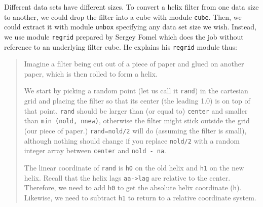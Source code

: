 \par
Different data sets have different sizes.
To convert a helix filter from one data size to another,
we could drop the filter into a cube with module \texttt{cube}.
Then, we could extract it with module \texttt{unbox}
specifying any data set size we wish.
Instead, we use module
\texttt{regrid} %
prepared by Sergey Fomel
which does the job without reference to an underlying filter cube.
He explains his \texttt{regrid} module thus:
        \begin{quotation}
        Imagine a filter being cut out of a piece of paper and
        glued on another paper, which is then rolled to form a helix.
\par            %
        We start by picking a random point (let us call it
        \texttt{rand}) in the
        cartesian grid and placing the filter so that its center
        (the leading 1.0) is on top of that point.
        \texttt{rand} should be larger than (or equal to)
        \texttt{center} and
        smaller than \texttt{min (nold, nnew)},
        otherwise the filter might stick outside the grid
        (our piece of paper.)
        \texttt{rand=nold/2} will do (assuming the filter is small),
        although nothing should change
        if you replace \texttt{nold/2} with a random integer array
        between \texttt{center} and \texttt{nold - na}.
\par
        The linear coordinate of \texttt{rand} is \texttt{h0}
        on the old helix and \texttt{h1} on the new helix.
        Recall that the helix lags \verb#aa->lag#
        are relative to the center.
        Therefore, we need to add \texttt{h0}
        to get the absolute helix coordinate (\texttt{h}).
        Likewise, we need to subtract \texttt{h1}
        to return to a relative coordinate system.
        \end{quotation}


